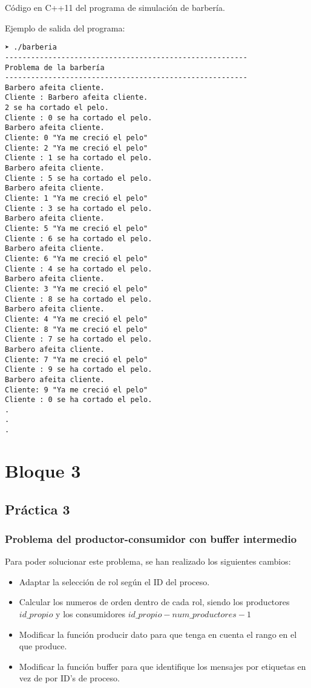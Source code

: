 \documentclass[12pt,a4paper]{article}
\begin{document}
Código en C++11 del programa de simulación de barbería.



Ejemplo de salida del programa:

\begin{verbatim}
➤ ./barberia 
--------------------------------------------------------
Problema de la barbería
--------------------------------------------------------
Barbero afeita cliente.
Cliente : Barbero afeita cliente.
2 se ha cortado el pelo.
Cliente : 0 se ha cortado el pelo.
Barbero afeita cliente.
Cliente: 0 "Ya me creció el pelo"
Cliente: 2 "Ya me creció el pelo"
Cliente : 1 se ha cortado el pelo.
Barbero afeita cliente.
Cliente : 5 se ha cortado el pelo.
Barbero afeita cliente.
Cliente: 1 "Ya me creció el pelo"
Cliente : 3 se ha cortado el pelo.
Barbero afeita cliente.
Cliente: 5 "Ya me creció el pelo"
Cliente : 6 se ha cortado el pelo.
Barbero afeita cliente.
Cliente: 6 "Ya me creció el pelo"
Cliente : 4 se ha cortado el pelo.
Barbero afeita cliente.
Cliente: 3 "Ya me creció el pelo"
Cliente : 8 se ha cortado el pelo.
Barbero afeita cliente.
Cliente: 4 "Ya me creció el pelo"
Cliente: 8 "Ya me creció el pelo"
Cliente : 7 se ha cortado el pelo.
Barbero afeita cliente.
Cliente: 7 "Ya me creció el pelo"
Cliente : 9 se ha cortado el pelo.
Barbero afeita cliente.
Cliente: 9 "Ya me creció el pelo"
Cliente : 0 se ha cortado el pelo.
.
.
.

\end{verbatim}




\section{Bloque 3}
\subsection{Práctica 3}

\subsubsection{Problema del productor-consumidor con buffer intermedio}
Para poder solucionar este problema, se han realizado los siguientes cambios:
\begin{itemize}

\item Adaptar la selección de rol según el ID del proceso.
\item Calcular los numeros de orden dentro de cada rol, siendo los productores $ id\_propio $ y los consumidores $ id\_propio - num\_productores - 1 $
\item Modificar la función producir dato para que tenga en cuenta el rango en el que produce.
\item Modificar la función buffer para que identifique los mensajes por etiquetas en vez de por ID's de proceso.

\end{itemize}
\end{document}
